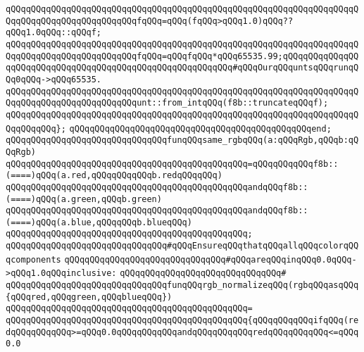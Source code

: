 \verb|qQQqqQQqqQQqqQQqqQQqqQQqqQQqqQQqqQQqqQQqqQQqqQQqqQQqqQQqqQQqqQQqqQQqqQQqqQQqqQQqqQQqqQQqqQQqqQQqfqQQq=qQQq(fqQQq>qQQq1.0)qQQq??qQQq1.0qQQq::qQQqf;|\newline
\newline
\verb|qQQqqQQqqQQqqQQqqQQqqQQqqQQqqQQqqQQqqQQqqQQqqQQqqQQqqQQqqQQqqQQqqQQqqQQqqQQqqQQqqQQqqQQqqQQqqQQqfqQQq=qQQqfqQQq*qQQq65535.99;qQQqqQQqqQQqqQQqqQQqqQQqqQQqqQQqqQQqqQQqqQQqqQQqqQQqqQQqqQQq#qQQqOurqQQquntsqQQqrunqQQq0qQQq->qQQq65535.|\newline
\newline
\verb|qQQqqQQqqQQqqQQqqQQqqQQqqQQqqQQqqQQqqQQqqQQqqQQqqQQqqQQqqQQqqQQqqQQqqQQqqQQqqQQqqQQqqQQqqQQqqQQqunt::from_intqQQq(f8b::truncateqQQqf);|\newline
\verb|qQQqqQQqqQQqqQQqqQQqqQQqqQQqqQQqqQQqqQQqqQQqqQQqqQQqqQQqqQQqqQQqqQQqqQQqqQQqqQQq};|\newline
\verb|qQQqqQQqqQQqqQQqqQQqqQQqqQQqqQQqqQQqqQQqqQQqqQQqend;|\newline
\newline
\newline
\verb|qQQqqQQqqQQqqQQqqQQqqQQqqQQqqQQqfunqQQqsame_rgbqQQq(a:qQQqRgb,qQQqb:qQQqRgb)|\newline
\verb|qQQqqQQqqQQqqQQqqQQqqQQqqQQqqQQqqQQqqQQqqQQqqQQq=qQQqqQQqqQQqf8b::(====)qQQq(a.red,qQQqqQQqqQQqb.redqQQqqQQq)|\newline
\verb|qQQqqQQqqQQqqQQqqQQqqQQqqQQqqQQqqQQqqQQqqQQqqQQqandqQQqf8b::(====)qQQq(a.green,qQQqb.green)|\newline
\verb|qQQqqQQqqQQqqQQqqQQqqQQqqQQqqQQqqQQqqQQqqQQqqQQqandqQQqf8b::(====)qQQq(a.blue,qQQqqQQqb.blueqQQq)|\newline
\verb|qQQqqQQqqQQqqQQqqQQqqQQqqQQqqQQqqQQqqQQqqQQqqQQq;|\newline
\newline
\newline
\verb|qQQqqQQqqQQqqQQqqQQqqQQqqQQqqQQq#qQQqEnsureqQQqthatqQQqallqQQqcolorqQQqcomponents|\newline
\verb|qQQqqQQqqQQqqQQqqQQqqQQqqQQqqQQq#qQQqareqQQqinqQQq0.0qQQq->qQQq1.0qQQqinclusive:|\newline
\verb|qQQqqQQqqQQqqQQqqQQqqQQqqQQqqQQq#|\newline
\verb|qQQqqQQqqQQqqQQqqQQqqQQqqQQqqQQqfunqQQqrgb_normalizeqQQq(rgbqQQqasqQQq{qQQqred,qQQqgreen,qQQqblueqQQq})|\newline
\verb|qQQqqQQqqQQqqQQqqQQqqQQqqQQqqQQqqQQqqQQqqQQqqQQq=|\newline
\verb|qQQqqQQqqQQqqQQqqQQqqQQqqQQqqQQqqQQqqQQqqQQqqQQq{qQQqqQQqqQQqifqQQq(redqQQqqQQqqQQq>=qQQq0.0qQQqqQQqqQQqandqQQqqQQqqQQqredqQQqqQQqqQQq<=qQQq0.0|\newline
